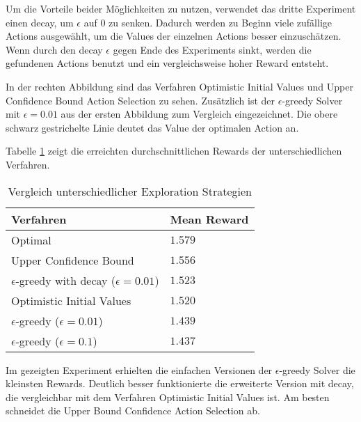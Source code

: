 \documentclass[11pt]{scrartcl}
\begin{document}
Um die Vorteile beider Möglichkeiten zu nutzen, verwendet das dritte Experiment einen
decay, um $\epsilon$ auf $0$ zu senken. Dadurch werden zu Beginn viele zufällige Actions
ausgewählt, um die Values der einzelnen Actions besser einzuschätzen. Wenn durch den decay
$\epsilon$ gegen Ende des Experiments sinkt, werden die gefundenen Actions benutzt und ein
vergleichsweise hoher Reward entsteht.

In der rechten Abbildung sind das Verfahren Optimistic Initial Values und Upper Confidence
Bound Action Selection zu sehen. Zusätzlich ist der $\epsilon$-greedy Solver mit
$\epsilon=0.01$ aus der ersten Abbildung zum Vergleich eingezeichnet. Die obere schwarz
gestrichelte Linie deutet das Value der optimalen Action an.

Tabelle \ref{tab:explorationstrategies} zeigt die erreichten durchschnittlichen Rewards
der unterschiedlichen Verfahren.

\begin{table}[ht]
  \begin{center}
    \begin{tabular}{l | l}
      \textbf{Verfahren} & \textbf{Mean Reward} \\
      \hline
      Optimal & $1.579$\\
      Upper Confidence Bound & $1.556$ \\
      $\epsilon$-greedy with decay ($\epsilon=0.01$) & $1.523$ \\
      Optimistic Initial Values & $1.520$ \\
      $\epsilon$-greedy ($\epsilon=0.01$) & $1.439$ \\
      $\epsilon$-greedy ($\epsilon=0.1$) & $1.437$ \\
    \end{tabular}

    \caption[ExplorationStrategies]{Vergleich unterschiedlicher Exploration Strategien}
    \label{tab:explorationstrategies}
  \end{center}
\end{table}

\noindent
Im gezeigten Experiment erhielten die einfachen Versionen der $\epsilon$-greedy Solver die
kleinsten Rewards. Deutlich besser funktionierte die erweiterte Version mit decay, die
vergleichbar mit dem Verfahren Optimistic Initial Values ist. Am besten schneidet die
Upper Bound Confidence Action Selection ab.


\newpage
\end{document}
